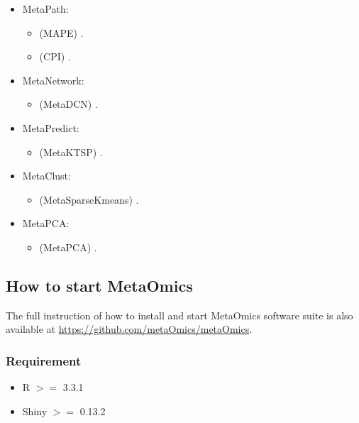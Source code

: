 \begin{itemize}
\item MetaPath: 
\begin{itemize}
\item (MAPE) .
\item (CPI) .
\end{itemize}

\item MetaNetwork: 
\begin{itemize}
\item (MetaDCN) .
\end{itemize}

\item MetaPredict: 
\begin{itemize}
\item (MetaKTSP) .
\end{itemize}

\item MetaClust: 
\begin{itemize}
\item (MetaSparseKmeans) .
\end{itemize}

\item MetaPCA: 

\begin{itemize}
\item (MetaPCA) .
\end{itemize}

\end{itemize}



\subsection{How to start MetaOmics}

The full instruction of how to install and start MetaOmics software suite is also available at \url{https://github.com/metaOmics/metaOmics}.


\subsubsection{Requirement}
\begin{itemize}
\item R $>=$ 3.3.1
\item Shiny $>=$ 0.13.2
\end{itemize}



